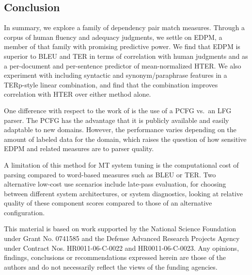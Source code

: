 \documentclass{kluwer}    %
\begin{document}
\begin{article}
\section{Conclusion}
\label{sec:conclusion}
In summary, we explore a family of dependency pair match measures.  Through a corpus of human fluency
and adequacy judgments,
we settle on EDPM, a member of that family with promising predictive
power.  We find that EDPM is superior to BLEU and TER in terms of
correlation with human judgments and as a per-document and
per-sentence predictor of mean-normalized HTER.
We also experiment with including syntactic and synonym/paraphrase 
features in a TERp-style linear combination, and find that the combination
improves correlation with HTER over either method alone.

One difference with respect to the work of  is the use of a PCFG vs.\ an LFG parser. The PCFG has the advantage that it
is publicly available and easily adaptable to new domains.  However, the performance varies depending on the amount of labeled data for the domain, which raises the question of how sensitive EDPM and related measures are to parser quality.

A limitation of this method for MT system tuning is the computational
cost of parsing compared to word-based measures such as BLEU or TER.
Two alternative low-cost use scenarios include late-pass
evaluation, for choosing between different system architectures,
or system diagnostics, looking at
relative quality of these component scores compared to those of an
alternative configuration.



\acknowledgements

{\small This material is based on work supported by the National
  Science Foundation under Grant No. 0741585 and the Defense Advanced
  Research Projects Agency under Contract Nos. HR0011-06-C-0022 and
  HR0011-06-C-0023.
  Any opinions, findings, conclusions or recommendations expressed
  herein are those of the authors and do not necessarily
  reflect the views of the funding agencies.  }


\theendnotes




\end{article}
\end{document}
